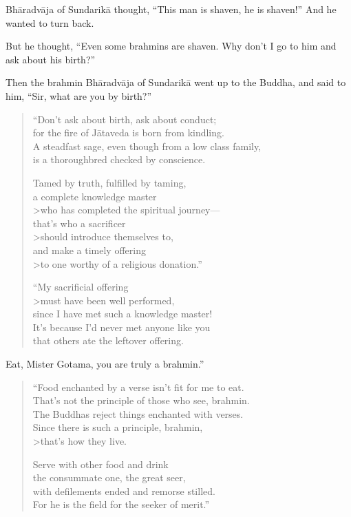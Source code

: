 \documentclass[12pt,openany]{book}%
\begin{document}
\textsanskrit{Bhāradvāja} of \textsanskrit{Sundarikā} thought, “This man is shaven, he is shaven!” And he wanted to turn back. 

But he thought, “Even some brahmins are shaven. Why don’t I go to him and ask about his birth?” 

Then the brahmin \textsanskrit{Bhāradvāja} of \textsanskrit{Sundarikā} went up to the Buddha, and said to him, “Sir, what are you by birth?” 

\begin{verse}%
“Don’t ask about birth, ask about conduct; \\
for the fire of \textsanskrit{Jātaveda} is born from kindling. \\
A steadfast sage, even though from a low class family, \\
is a thoroughbred checked by conscience. 

Tamed by truth, fulfilled by taming, \\
a complete knowledge master \\>who has completed the spiritual journey—\\
that’s who a sacrificer \\>should introduce themselves to, \\
and make a timely offering \\>to one worthy of a religious donation.” 

“My sacrificial offering \\>must have been well performed, \\
since I have met such a knowledge master! \\
It’s because I’d never met anyone like you \\
that others ate the leftover offering. 

%
\end{verse}

Eat, Mister Gotama, you are truly a brahmin.” 

\begin{verse}%
“Food enchanted by a verse isn’t fit for me to eat. \\
That’s not the principle of those who see, brahmin. \\
The Buddhas reject things enchanted with verses. \\
Since there is such a principle, brahmin, \\>that’s how they live. 

Serve with other food and drink \\
the consummate one, the great seer, \\
with defilements ended and remorse stilled. \\
For he is the field for the seeker of merit.” 

%
\end{verse}
\end{document}
